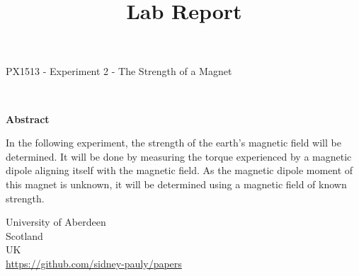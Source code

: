 \documentclass[14pt]{article}
\begin{document}
\lstset{
  language=Python,
  basicstyle=\small,          %
  keywordstyle=\bfseries,
  identifierstyle=,           %
  commentstyle=,              %
  stringstyle=\ttfamily,      %
  showstringspaces=false,     %
  numbers=left,
  numberstyle=\tiny,
  numbersep=5pt,
  frame=tb,
}

\title{Lab Report}
\date{}
\def\theinstructor{}




\fancyhf{}



\begin{titlepage}
  \begin{center}
    \Large
    \textbf{\thetitle}
        
    \vspace{0.4cm}
    \large
    PX1513 - Experiment 2 - The Strength of a Magnet
        
    \vspace{0.4cm}
    \textbf{\theauthor}\\
    \textbf{\theuoastudentid}

       
    \vspace{0.9cm}
    \textbf{Abstract}
  \end{center}
  In the following experiment, the strength of the earth's magnetic field will be determined.
  It will be done by measuring the torque experienced by a magnetic dipole aligning itself
  with the magnetic field. As the magnetic dipole moment of this magnet is unknown, it will
  be determined using a magnetic field of known strength.

  \vfill

  \begin{center}

    University of Aberdeen\\
    Scotland\\
    UK\\
    \thedate
    \vspace{0.4cm}
    \url{https://github.com/sidney-pauly/papers}
  \end{center}
\end{titlepage}
\end{document}
